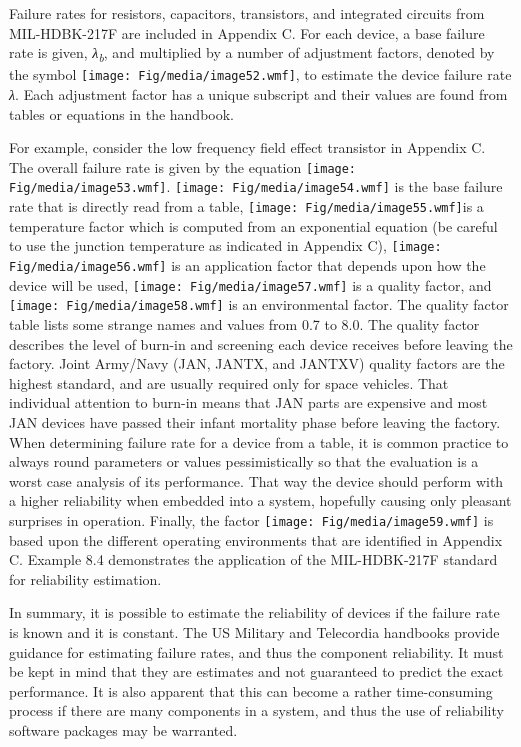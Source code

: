 Failure rates for resistors, capacitors, transistors, and integrated
circuits from MIL-HDBK-217F are included in Appendix C. For each device,
a base failure rate is given, \emph{λ\textsubscript{b}}, and multiplied
by a number of adjustment factors, denoted by the symbol
\texttt{[image: Fig/media/image52.wmf]}, to estimate the device failure
rate \emph{λ}. Each adjustment factor has a unique subscript and their
values are found from tables or equations in the handbook.

For example, consider the low frequency field effect transistor in
Appendix C. The overall failure rate is given by the equation
\texttt{[image: Fig/media/image53.wmf]}.
\texttt{[image: Fig/media/image54.wmf]} is the base failure rate that is
directly read from a table, \texttt{[image: Fig/media/image55.wmf]}is a
temperature factor which is computed from an exponential equation (be
careful to use the junction temperature as indicated in Appendix C),
\texttt{[image: Fig/media/image56.wmf]} is an application factor that
depends upon how the device will be used,
\texttt{[image: Fig/media/image57.wmf]} is a quality factor, and
\texttt{[image: Fig/media/image58.wmf]} is an environmental factor. The
quality factor table lists some strange names and values from 0.7 to
8.0. The quality factor describes the level of burn-in and screening
each device receives before leaving the factory. Joint Army/Navy (JAN,
JANTX, and JANTXV) quality factors are the highest standard, and are
usually required only for space vehicles. That individual attention to
burn-in means that JAN parts are expensive and most JAN devices have
passed their infant mortality phase before leaving the factory. When
determining failure rate for a device from a table, it is common
practice to always round parameters or values pessimistically so that
the evaluation is a worst case analysis of its performance. That way the
device should perform with a higher reliability when embedded into a
system, hopefully causing only pleasant surprises in operation. Finally,
the factor \texttt{[image: Fig/media/image59.wmf]} is based upon the
different operating environments that are identified in Appendix C.
Example 8.4 demonstrates the application of the MIL-HDBK-217F standard
for reliability estimation.

In summary, it is possible to estimate the reliability of devices if the
failure rate is known and it is constant. The US Military and Telecordia
handbooks provide guidance for estimating failure rates, and thus the
component reliability. It must be kept in mind that they are estimates
and not guaranteed to predict the exact performance. It is also apparent
that this can become a rather time-consuming process if there are many
components in a system, and thus the use of reliability software
packages may be warranted.

